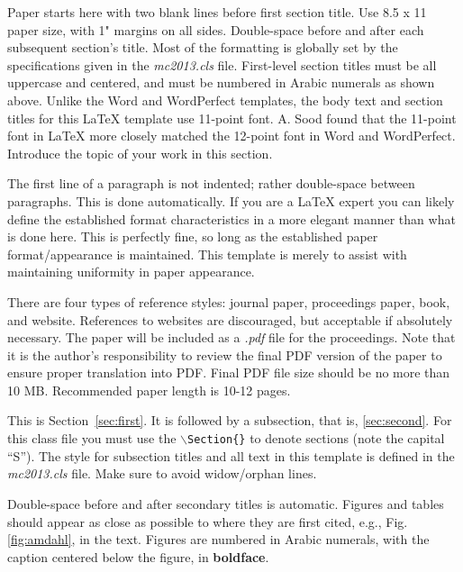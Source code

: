 \documentclass{mc2013}
\begin{document}

Paper starts here with two blank lines before first section title.  Use 
8.5 x 11 paper size, with 1" margins on all sides.  Double-space before and
after each subsequent section's title.  Most of the formatting is globally
set by the specifications given in the {\it mc2013.cls} file.  
First-level section titles must be all uppercase and centered, and must 
be numbered in Arabic numerals as shown above.  Unlike the Word and WordPerfect
templates, the body text and section titles for this {\LaTeX} template use 
11-point font.  A. Sood found that the 11-point font in {\LaTeX} more closely 
matched the 12-point font in Word and WordPerfect.  Introduce the topic of 
your work in this section.

The first line of a paragraph is not indented; rather double-space between 
paragraphs.  This is done automatically. If you are a {\LaTeX} expert you 
can likely define the established format characteristics in a more elegant 
manner than what is done here.  This is perfectly fine, so long as the 
established paper format/appearance is maintained.  This template is merely 
to assist with maintaining uniformity in paper appearance.

There are four types of reference styles: journal paper\cite{journal},
proceedings paper\cite{proc_paper}, book\cite{book}, and website\cite{techrep}.
References to websites are discouraged, but acceptable if absolutely necessary.
The paper will be included as a {\it .pdf} file for the proceedings. Note that
it is the author's responsibility to review the final PDF version of the paper
to ensure proper translation into PDF.  Final PDF file size should be no more
than 10 MB. Recommended paper length is 10-12 pages.

\label{sec:first}

This is Section~\ref{sec:first}. It is followed by a subsection, that is, 
\ref{sec:second}. For this class file you must use the 
\texttt{$\backslash$Section\{\}} to denote sections (note the capital ``S'').  
The style for subsection titles and all text in this template is defined in 
the {\it mc2013.cls} file.  Make sure to avoid widow/orphan lines.


\label{sec:second}

Double-space before and after secondary titles is automatic.  Figures and 
tables should appear as close as possible to where they are first
cited, e.g., Fig. \ref{fig:amdahl}, in the text.  Figures are numbered in 
Arabic numerals, with the caption centered below the figure, in 
{\bf boldface}.
  
\end{document}
